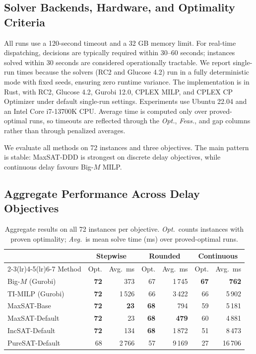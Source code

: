 \documentclass[runningheads]{llncs}
\begin{document}
\subsection{Solver Backends, Hardware, and Optimality Criteria}

All runs use a 120-second timeout and a 32 GB memory limit. For real-time dispatching, decisions are typically required within 30--60 seconds; instances solved within 30 seconds are considered operationally tractable. We report single-run times because the solvers (RC2 and Glucose 4.2) run in a fully deterministic mode with fixed seeds, ensuring zero runtime variance. The implementation is in Rust, with RC2, Glucose 4.2, Gurobi 12.0, CPLEX MILP, and CPLEX CP Optimizer under default single-run settings. Experiments use Ubuntu 22.04 and an Intel Core i7-13700K CPU. Average time is computed only over proved-optimal runs, so timeouts are reflected through the \emph{Opt.}, \emph{Feas.}, and gap columns rather than through penalized averages.

We evaluate all methods on 72 instances and three objectives. The main pattern
is stable: MaxSAT-DDD is strongest on discrete delay objectives, while
continuous delay favours Big-$M$ MILP.

\subsection{Aggregate Performance Across Delay Objectives}
\label{subsec:aggregate}

\begin{table}[H]
\centering
\caption{Aggregate results on all 72 instances per objective. \emph{Opt.}~counts instances with proven optimality; \emph{Avg.}~is mean solve time (ms) over proved-optimal runs.}
\label{tab:overall-main}
\scriptsize
\setlength{\tabcolsep}{4.5pt}
\renewcommand{\arraystretch}{1.0}
\begin{tabular}{lrrrrrr}
\toprule
& \multicolumn{2}{c}{Stepwise} & \multicolumn{2}{c}{Rounded} & \multicolumn{2}{c}{Continuous} \\
\cmidrule(lr){2-3}\cmidrule(lr){4-5}\cmidrule(lr){6-7}
Method & Opt. & Avg.~ms & Opt. & Avg.~ms & Opt. & Avg.~ms \\
\midrule
Big-$M$ (Gurobi) & \textbf{72} & 373 & 67 & 1\,745 & \textbf{67} & \textbf{762} \\
TI-MILP (Gurobi) & \textbf{72} & 1\,526 & 66 & 3\,422 & 66 & 5\,902 \\
MaxSAT-Base & \textbf{72} & \textbf{23} & \textbf{68} & 794 & 59 & 5\,181 \\
MaxSAT-Default & \textbf{72} & 23 & \textbf{68} & \textbf{479} & 60 & 4\,881 \\
IncSAT-Default & \textbf{72} & 134 & \textbf{68} & 1\,872 & 51 & 8\,473 \\
PureSAT-Default & 68 & 2\,766 & 57 & 9\,169 & 27 & 16\,706 \\
\bottomrule
\end{tabular}
\end{table}
\end{document}
